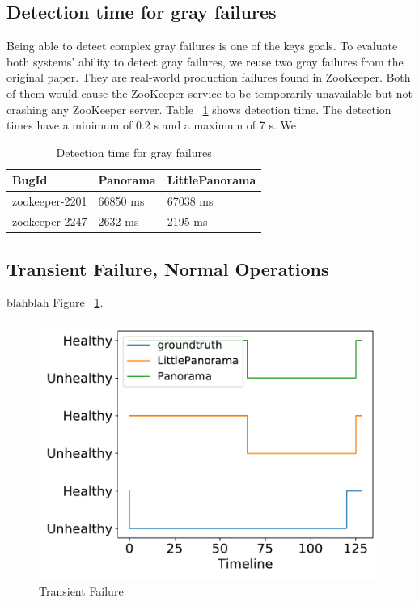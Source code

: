 \subsection{Detection time for gray failures}
Being able to detect complex gray failures is one of the keys goals. To evaluate both systems' ability to detect gray failures, we reuse two gray failures from the original paper. They are real-world production failures found in ZooKeeper. Both of them would cause the ZooKeeper service to be temporarily unavailable but not crashing any ZooKeeper server. Table ~\ref{tab:grayperf} shows detection time. The detection times have a minimum of 0.2 s and a maximum of 7 s. We 

\begin{table}[!tb]
\begin{tabular}{p{}p{}p{}}%

\toprule
\textbf{BugId} & \textbf{Panorama} & \textbf{LittlePanorama} \\
\midrule
  zookeeper-2201    &   66850 ms   &  67038 ms \\
  zookeeper-2247    &   2632 ms    &  2195 ms  \\
\bottomrule
\end{tabular}
\vspace{0.5em}
\caption{Detection time for gray failures}
\label{tab:grayperf}
\end{table}

\subsection{Transient Failure, Normal Operations}
blahblah Figure ~\ref{fig:transient}.

\begin{figure}[!tb]
\centering
\includegraphics[scale=0.4]{figs/transient.pdf}
\vspace{-1em}
\caption{Transient Failure
\label{fig:transient}
}
\end{figure}

